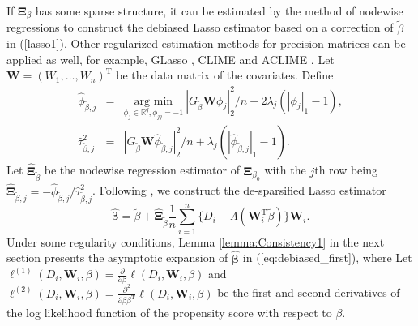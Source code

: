 \documentclass[12pt]{article}
\def\bea{\begin{eqnarray}}
\def\eea{\end{eqnarray}}
\def\T{{ \mathrm{\scriptscriptstyle T} }}
\theoremstyle{definition}
\newcommand{\bW}{{\mathbf W}}
\newcommand{\bbeta}  {\boldsymbol{\beta}}
\newcommand{\bXi}{\boldsymbol{\Xi}}
\begin{document}
If $\bXi_{\beta}$ has some sparse structure, it can be estimated by the method of nodewise regressions \citep{vanderGeerRitov2014, jankova2016confidence} to construct the debiased Lasso estimator based on a correction of $\tilde{\beta}$ in (\ref{lasso1}).
Other regularized estimation methods for precision matrices can be applied as well, for example, GLasso \citep{friedman2008sparse}, CLIME and ACLIME \citep{CaiLiuLuo2011constrained, cai2016estimating}.
Let $\mathbf{W} = (W_{1}, \ldots, W_{n})^{\T}$ be the data matrix of the covariates.
Define 
\bea
\hat{\phi}_{\tilde{\beta}, j} &=& \underset{\phi_{j} \in \mathbb{R}^{q}, \phi_{jj} = -1}{\mbox{arg min}} \ |G_{\tilde{\beta}} \mathbf{W} \phi_{j}|_{2}^{2} / n + 2 \lambda_{j} (|\phi_{j}|_{1} - 1), \label{eq:nodewise1a} \\
\hat{\tau}_{\tilde{\beta}, j}^{2} &=& |G_{\tilde{\beta}} \mathbf{W} \hat{\phi}_{\tilde{\beta}, j}|_{2}^{2} / n + \lambda_{j} (|\hat{\phi}_{\tilde{\beta}, j}|_{1} - 1). \label{eq:nodewise1b} 
\eea
Let $\hat{\bXi}_{\tilde{\beta}}$ be the nodewise regression estimator of $\bXi_{\beta_{0}}$ with the $j$th row being $\hat{\bXi}_{\tilde{\beta}, j} = -\hat{\phi}_{\tilde{\beta}, j} / \hat{\tau}_{\tilde{\beta}, j}^{2}$.
Following \cite{vanderGeerRitov2014}, we construct the de-sparsified Lasso estimator
\begin{equation}
\hat{\bbeta} = \tilde{\beta} + \hat{\bXi}_{\tilde{\beta}} \frac{1}{n}\sum_{i = 1}^{n}\big\{D_{i}-\Lambda(\bW_{i}^{\T}\tilde{\beta})\big\}%
\bW_{i}.
\label{eq:debiased_first}
\end{equation}
Under some regularity conditions, Lemma \ref{lemma:Consistency1} in the next section presents the asymptotic expansion of $\hat{\bbeta}$ in (\ref{eq:debiased_first}), where 
%
%
Let $\ell^{(1)}(D_{i}, \bW_{i}, \beta) = \frac{\partial}{\partial\beta} \ell(D_{i}, \bW_{i}, \beta)$ and $\ell^{(2)}(D_{i}, \bW_{i}, \beta) = \frac{\partial^{2}}{\partial\beta\beta^{\T}} \ell(D_{i}, \bW_{i}, \beta)$ be the first and second derivatives of the log likelihood function of the propensity score with respect to $\beta$.
\end{document}
